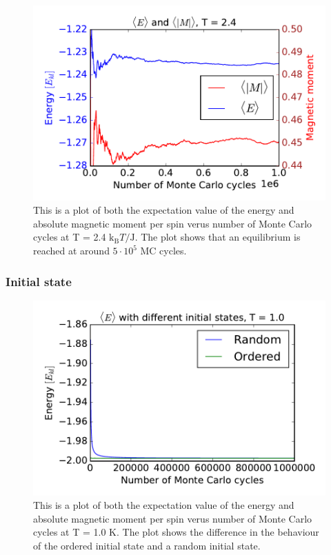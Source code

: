 \begin{figure}[H]
\includegraphics[width=\linewidth]{../results/4c/En_mag_T2_4}\caption{This is a plot of both the expectation value of the energy and absolute magnetic moment per spin verus number of Monte Carlo cycles at T = 2.4 $\text{k}_\text{B}T/\text{J}$. The plot shows that an equilibrium is reached at around $5 \cdot 10^{5}$ MC cycles.}\label{fig:L_20_energy_mag_T_2.4}
\end{figure}

\subsubsection{Initial state}

\begin{figure}[H]
\includegraphics[width=\linewidth]{../results/4c/ran_order_T1}\caption{This is a plot of both the expectation value of the energy and absolute magnetic moment per spin verus number of Monte Carlo cycles at T = 1.0 K. The plot shows the difference in the behaviour of the ordered initial state and a random initial state.}\label{fig:L_20_initial_T_1.0}
\end{figure}

